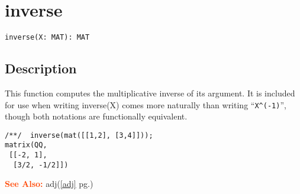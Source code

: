 \documentclass[a4paper]{mybook}
\newenvironment{command}{}{} %
\newcommand\SeeAlso{\par\textcolor{OrangeRed}{\textbf{\large See Also: }}}
\begin{document}
\section{inverse}
\label{inverse}
\begin{command} %


\begin{Verbatim}[label=syntax, rulecolor=\color{MidnightBlue},
frame=single]
inverse(X: MAT): MAT
\end{Verbatim}


\subsection*{Description}

This function computes the multiplicative inverse of its argument.
It is included for use when writing inverse(X) comes more naturally
than writing ``\verb&X^(-1)&'', though both notations are functionally equivalent.
\begin{Verbatim}[label=example, rulecolor=\color{PineGreen}, frame=single]
/**/  inverse(mat([[1,2], [3,4]]));
matrix(QQ,
 [[-2, 1],
  [3/2, -1/2]])
\end{Verbatim}


\SeeAlso %
  adj(\ref{adj} pg.\pageref{adj})
\end{command} %
\end{document}
